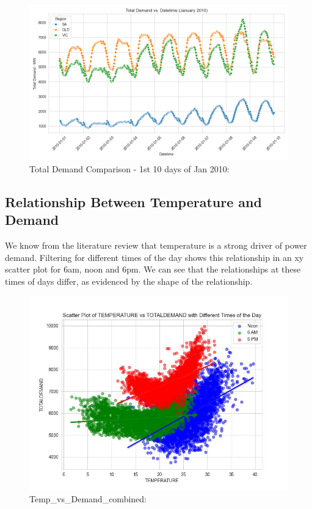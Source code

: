 \documentclass[
]{article}
\begin{document}
\begin{figure}
\centering
\includegraphics{img/TotalDemand_Jan2010.png}
\caption{Total Demand Comparison - 1st 10 days of Jan 2010:}
\end{figure}

\subsection{Relationship Between Temperature and
Demand}\label{relationship-between-temperature-and-demand}

We know from the literature review that temperature is a strong driver
of power demand. Filtering for different times of the day shows this
relationship in an xy scatter plot for 6am, noon and 6pm. We can see
that the relationships at these times of days differ, as evidenced by
the shape of the relationship.

\begin{figure}
\centering
\includegraphics{img/Temp_vs_Demand_combined.jpg}
\caption{Temp\_vs\_Demand\_combined:}
\end{figure}
\end{document}
